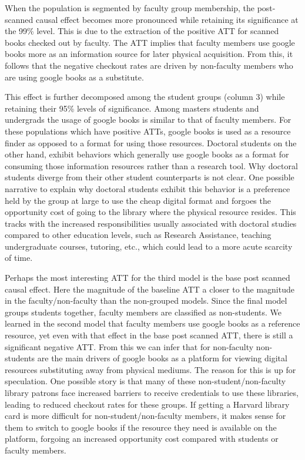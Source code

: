 \documentclass{article}
\begin{document}
When the population is segmented by faculty group membership, the post-scanned causal effect becomes more pronounced while retaining its significance at the 99\% level. This is due to the extraction of the positive ATT for scanned books checked out by faculty. The ATT implies that faculty members use google books more as an information source for later physical acquisition. From this, it follows that the negative checkout rates are driven by non-faculty members who are using google books as a substitute. 

This effect is further decomposed among the student groups (column 3) while retaining their 95\% levels of significance. Among masters students and undergrads the usage of google books is similar to that of faculty members. For these populations which have positive ATTs, google books is used as a resource finder as opposed to a format for using those resources. Doctoral students on the other hand, exhibit behaviors which generally use google books as a format for consuming those information resources rather than a research tool. Why doctoral students diverge from their other student counterparts is not clear. One possible narrative to explain why doctoral students exhibit this behavior is a preference held by the group at large to use the cheap digital format and forgoes the opportunity cost of going to the library where the physical resource resides. This tracks with the increased responsibilities usually associated with doctoral studies compared to other education levels, such as Research Assistance, teaching undergraduate courses, tutoring, etc., which could lead to a more acute scarcity of time.

Perhaps the most interesting ATT for the third model is the base post scanned causal effect. Here the magnitude of the baseline ATT a closer to the magnitude in the faculty/non-faculty than the non-grouped models. Since the final model groups students together, faculty members are classified as non-students. We learned in the second model that faculty members use google books as a reference resource, yet even with that effect in the base post scanned ATT, there is still a significant negative ATT. From this we can infer that for non-faculty non-students are the main drivers of google books as a platform for viewing digital resources substituting away from physical mediums. The reason for this is up for speculation. One possible story is that many of these non-student/non-faculty library patrons face increased barriers to receive credentials to use these libraries, leading to reduced checkout rates for these groups. If getting a Harvard library card is more difficult for non-student/non-faculty members, it makes sense for them to switch to google books if the resource they need is available on the platform, forgoing an increased opportunity cost compared with students or faculty members.
\end{document}
